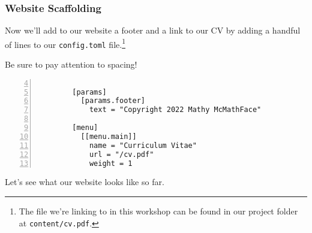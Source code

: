 \begin{frame}[fragile]
    \frametitle{Website Scaffolding}

    Now we'll add to our website a footer and a link to our CV by adding a handful of lines to our \texttt{config.toml} 
    file.\footnote{
      The file we're linking to in this workshop can be found in our project folder at \texttt{content/cv.pdf}.
    } 

    \bigskip
    
    Be sure to pay attention to spacing!

    \smallskip

    \begin{lstlisting}[style=saneCode,gobble=8,title={config.toml},numbers=left,firstnumber=4]
        
        [params]
          [params.footer]
            text = "Copyright 2022 Mathy McMathFace"
        
        [menu]
          [[menu.main]]
            name = "Curriculum Vitae"
            url = "/cv.pdf"
            weight = 1
    \end{lstlisting}

    \vfill

    Let's see what our website looks like so far.
\end{frame}